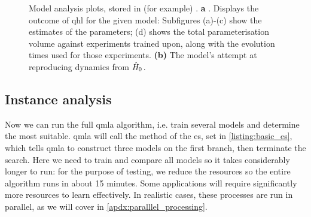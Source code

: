 \begin{figure}[H]
    \begin{center}
    \qquad
    \end{center}
    \caption[Model analysis plots]{
        Model analysis plots, stored in (for example) . 
        \textbf{a} . 
        Displays the outcome of \gls{qhl} for the given model:
        Subfigures (a)-(c) show the estimates of the parameters; 
        (d) shows the total parameterisation \gls{volume} against experiments trained upon, 
        along with the evolution times used for those experiments. 
        \textbf{(b)}  The model's attempt at reproducing dynamics from $\hat{H}_0$. 
    }
    \label{fig:model_analysis}
\end{figure}

\subsection{Instance analysis}
Now we can run the full \gls{qmla} algorithm, i.e. train several models 
    and determine the most suitable. 
\gls{qmla} will call the  method of the  \gls{es},
    set in \cref{listing:basic_es}, which tells \gls{qmla} to construct three models
    on the first branch, then terminate the search.
Here we need to train and compare all models so it takes considerably longer to run:
    for the purpose of testing, we reduce the resources so the entire algorithm runs in about 15 minutes.
Some applications will require significantly more resources to learn effectively.
In realistic cases, these processes are run in parallel, as we will cover in \cref{apdx:paralllel_processing}.
\par 

